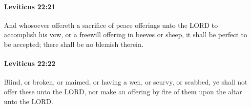 		\paragraph{Leviticus 22:21} %
			\label{LEVITICUS-22-21}

			And whosoever offereth a sacrifice of peace offerings unto the LORD to accomplish his vow, or a freewill offering in beeves or sheep, it shall be perfect to be accepted; there shall be no blemish therein.


		\paragraph{Leviticus 22:22} %
			\label{LEVITICUS-22-22}

			Blind, or broken, or maimed, or having a wen, or scurvy, or scabbed, ye shall not offer these unto the LORD, nor make an offering by fire of them upon the altar unto the LORD.

